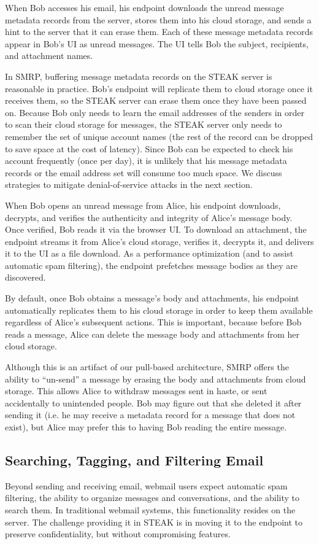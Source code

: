 When Bob accesses his email, his endpoint downloads the unread message metadata records from the server, stores them into his cloud storage, and sends a hint to the server that it can erase them.  Each of these message metadata records appear in Bob's UI as unread messages. The UI tells Bob the subject, recipients, and attachment names.

In SMRP, buffering message metadata records on the STEAK server is reasonable in practice. Bob’s endpoint will replicate them to cloud storage once it receives them, so the STEAK server can erase them once they have been passed on.  Because Bob only needs to learn the email addresses of the senders in order to scan their cloud storage for messages, the STEAK server only needs to remember the set of unique account names (the rest of the record can be dropped to save space at the cost of latency).  Since Bob can be expected to check his account frequently (once per day), it is unlikely that his message metadata records or the email address set will consume too much space.  We discuss strategies to mitigate denial-of-service attacks in the next section.

When Bob opens an unread message from Alice, his endpoint downloads, decrypts, and verifies the authenticity and integrity of Alice's message body. Once verified, Bob reads it via the browser UI. To download an attachment, the endpoint streams it from Alice's cloud storage, verifies it, decrypts it, and delivers it to the UI as a file download.  As a performance optimization (and to assist automatic spam filtering), the endpoint prefetches message bodies as they are discovered.

By default, once Bob obtains a message’s body and attachments, his endpoint automatically replicates them to his cloud storage in order to keep them available regardless of Alice's subsequent actions.  This is important, because before Bob reads a message, Alice can delete the message body and attachments from her cloud storage.

Although this is an artifact of our pull-based architecture, SMRP offers the ability to “un-send” a message by erasing the body and attachments from cloud storage.  This allows Alice to withdraw messages sent in haste, or sent accidentally to unintended people.  Bob may figure out that she deleted it after sending it (i.e. he may receive a metadata record for a message that does not exist), but Alice may prefer this to having Bob reading the entire message.

\subsection{Searching, Tagging, and Filtering Email}
Beyond sending and receiving email, webmail users expect automatic spam filtering, the ability to organize messages and conversations, and the ability to search them.  In traditional webmail systems, this functionality resides on the server.  The challenge providing it in STEAK is in moving it to the endpoint to preserve confidentiality, but without compromising features.

